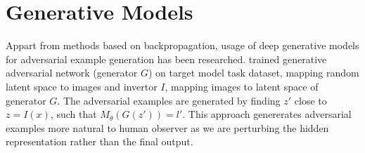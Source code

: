 \section{Generative Models}
\label{sec:advex_gan}
Appart from methods based on backpropagation, usage of deep generative models for adversarial example generation has been researched. \cite{gan-advex} trained generative adversarial network (generator $G$) on target model task dataset, mapping random latent space to images and invertor $I$, mapping images to latent space of generator $G$. The adversarial examples are generated by finding $z'$ close to $z = I(x)$, such that $M_\theta\left(G(z')\right) = l'$. This approach genererates adversarial examples more natural to human observer as we are perturbing the hidden representation rather than the final output.
